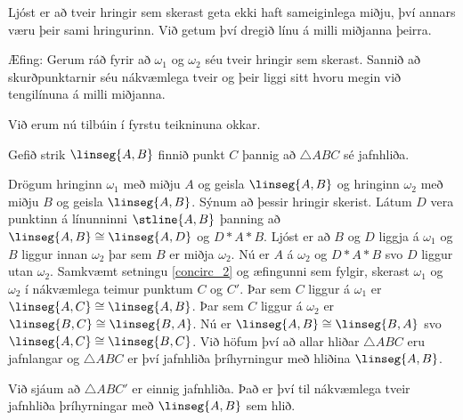 Ljóst er að tveir hringir sem skerast geta ekki haft sameiginlega miðju, því annars væru þeir sami hringurinn. Við getum því dregið línu á milli miðjanna þeirra.

Æfing: Gerum ráð fyrir að $\omega_1$ og $\omega_2$ séu tveir hringir sem skerast. Sannið að skurðpunktarnir séu nákvæmlega tveir og þeir liggi sitt hvoru megin við tengilínuna á milli miðjanna.

Við erum nú tilbúin í fyrstu teikninuna okkar.

\begin{proposition}
Gefið strik $\linseg{A,B}$ finnið punkt $C$ þannig að $\triangle ABC$ sé jafnhliða.
\end{proposition}

\begin{solution}
Drögum hringinn $\omega_1$ með miðju $A$ og geisla $\linseg{A,B}$ og hringinn $\omega_2$ með miðju $B$ og geisla $\linseg{A,B}$. Sýnum að þessir hringir skerist. Látum $D$ vera punktinn á línunninni $\stline{A,B}$ þanning að $\linseg{A,B} \cong \linseg{A,D}$ og $D*A*B$. Ljóst er að $B$ og $D$ liggja á $\omega_1$ og $B$ liggur innan $\omega_2$ þar sem $B$ er miðja $\omega_2$. Nú er $A$ á $\omega_2$ og $D*A*B$ svo $D$ liggur utan $\omega_2$. Samkvæmt setningu \ref{concirc_2} og æfingunni sem fylgir, skerast $\omega_1$ og $\omega_2$ í nákvæmlega teimur punktum $C$ og $C'$. Þar sem $C$ liggur á $\omega_1$ er $\linseg{A,C} \cong \linseg{A,B}$. Þar sem $C$ liggur á $\omega_2$ er $\linseg{B,C} \cong \linseg{B,A}$. Nú er $\linseg{A,B} \cong \linseg{B,A}$ svo $\linseg{A,C} \cong \linseg{B,C}$. Við höfum því að allar hliðar $\triangle ABC$ eru jafnlangar og $\triangle ABC$ er því jafnhliða þríhyrningur með hliðina $\linseg{A,B}$.

\begin{figure}[htbp]
\centering

\end{figure}
\end{solution}

\begin{remark}
Við sjáum að $\triangle ABC'$ er einnig jafnhliða. Það er því til nákvæmlega tveir jafnhliða þríhyrningar með $\linseg{A,B}$ sem hlið.
\end{remark}
